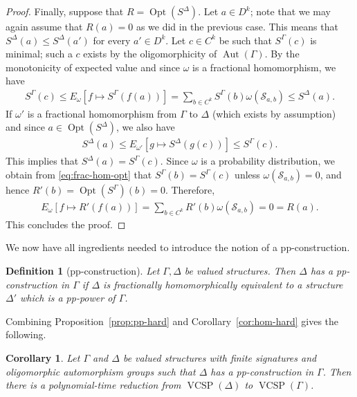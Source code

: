 \documentclass[nonacm]{acmart}
\DeclareMathOperator{\Aut}{Aut}
\DeclareMathOperator{\VCSP}{VCSP}
\DeclareMathOperator{\Opt}{Opt}
\newtheorem{definition}[theorem]{Definition}
\newtheorem{corollary}[theorem]{Corollary}
\begin{document}
\begin{proof}
Finally, suppose that $R = \Opt(S^{\Delta})$. Let $a \in D^k$; note that we may again assume that $R(a)=0$ as we did in the previous case. This means that $S^{\Delta}(a) \leq S^{\Delta}(a')$ for every $a' \in D^k$. Let $c \in C^k$ be such that $S^{\Gamma}(c)$ is minimal; such a $c$ exists by the oligomorphicity of $\Aut(\Gamma)$.
By the monotonicity of expected value and since $\omega$ is a fractional homomorphism, we have
\begin{align}
S^{\Gamma}(c) \leq E_\omega[f \mapsto S^{\Gamma}(f(a))]=
\sum_{b \in C^k} S^{\Gamma}(b) \omega({\mathscr S}_{a,b}) \leq S^{\Delta}(a).
\label{eq:frac-hom-opt}
\end{align}
If $\omega'$ is a fractional homomorphism from $\Gamma$ to $\Delta$ (which exists by assumption) and since $a \in \Opt(S^\Delta)$, we also have
\begin{align*}
S^{\Delta}(a) \leq E_{\omega'}[g \mapsto S^{\Delta}(g(c))] \leq S^{\Gamma}(c).
\end{align*}
This implies that $S^\Delta(a) = S^{\Gamma}(c)$.
Since $\omega$ is a probability distribution, we obtain from \eqref{eq:frac-hom-opt} that $S^{\Gamma}(b) = S^{\Gamma}(c)$ unless $\omega({\mathscr S}_{a,b}) = 0$, and hence $R'(b) = \Opt(S^\Gamma)(b) = 0$. Therefore,  
\begin{align*}
E_\omega[f \mapsto R'(f(a))]
= \sum_{b \in C^k} R'(b) \omega({\mathscr S}_{a,b}) = 0 = R(a).
\end{align*}  
This concludes the proof.
\end{proof}

We now have all ingredients needed to introduce the notion of a pp-construction.

\begin{definition}[pp-construction]
Let $\Gamma, \Delta$ be valued structures. Then  $\Delta$ has a \emph{pp-construction} in $\Gamma$ if $\Delta$ 
is fractionally homomorphically equivalent to a structure $\Delta'$ which is a pp-power of $\Gamma$. 
\end{definition}

Combining Proposition~\ref{prop:pp-hard} and Corollary~\ref{cor:hom-hard} gives the 
following.
\begin{corollary}\label{cor:pp-constr-red}
Let $\Gamma$ and $\Delta$ be valued structures 
with finite signatures and oligomorphic automorphism groups such that $\Delta$ has a pp-construction in $\Gamma$. Then there is a  polynomial-time reduction from 
$\VCSP(\Delta)$ to $\VCSP(\Gamma)$.
\end{corollary}
\end{document}
